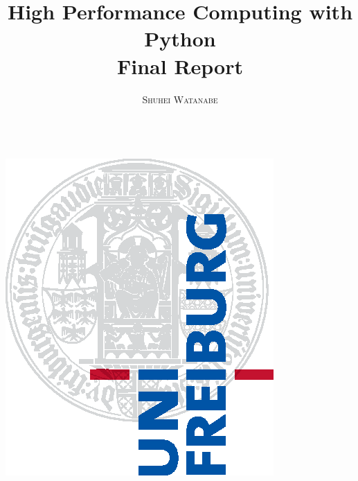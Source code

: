 \documentclass[a4paper,11pt]{report}
\title{\Huge \textbf{High Performance Computing with Python} \vspace{4mm} \\ \huge Final Report}
\author{\textsc{Shuhei Watanabe} \\ \vspace{3mm}\text{5171091}  \\
\vspace{3mm}\text{watanabs@informatik.uni-freiburg.de}}
\renewcommand{\_}{{\tiny \textunderscore}}
\begin{document}
\makeatletter
    \begin{titlepage}
        \begin{center}
            \includegraphics[width=0.5\linewidth]{logos/Uni_Logo-Grundversion_E1_A4_CMYK.eps}\\[4ex]
            {\huge \bfseries  \@title }\\[2ex] 
            {\LARGE  \@author}\\[30ex] 
            {\large \@date}
        \end{center}
    \end{titlepage}
\makeatother
\thispagestyle{empty}
\newpage

\tableofcontents

\end{document}
